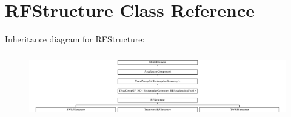 \hypertarget{classRFStructure}{}\section{R\+F\+Structure Class Reference}
\label{classRFStructure}
Inheritance diagram for R\+F\+Structure\+:\begin{figure}[H]
\begin{center}
\leavevmode
\includegraphics[height=2.835443cm]{classRFStructure}
\end{center}
\end{figure}
